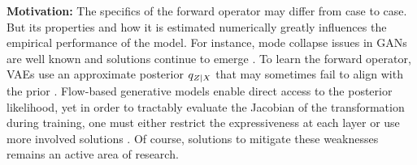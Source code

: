





{\bf Motivation:} The specifics 
of the forward operator may differ from case to case. But its properties and how it is estimated 
numerically greatly influences the empirical performance of the model. 
For instance, mode collapse issues in GANs are well known and solutions continue to emerge \citep{srivastava2017veegan}. To learn the forward operator, VAEs use an approximate posterior $q_{\var{Z}|\var{X}}$ that may 
sometimes fail to align with the prior \citep{Kingma2016improved, dai2018diagnosing}. 
Flow-based generative models enable direct access to the posterior likelihood, yet in order to tractably evaluate the Jacobian of the transformation during training, one must either restrict the expressiveness at each layer \citep{dinh2017RealNVP, Kingma2018Glow} or use more involved solutions \citep{Chen2018neuralode}. 
Of course, solutions 
to mitigate these weaknesses \citep{ho2019flow++} remains an active area of research.


